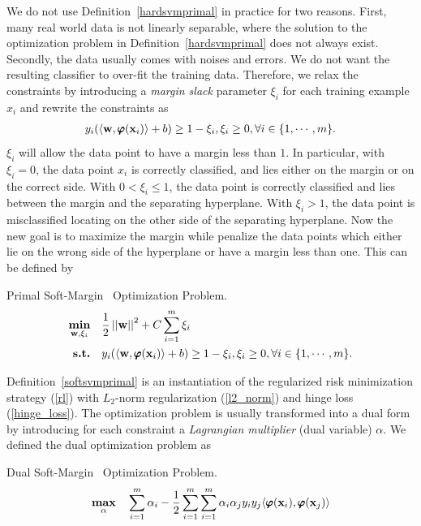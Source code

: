 {%
We do not use Definition~\ref{hardsvmprimal} in practice for two reasons. 
First, many real world data is not linearly separable, where the solution to the optimization problem in Definition~\ref{hardsvmprimal} does not always exist.
Secondly, the data usually comes with noises and errors.
We do not want the resulting classifier to over-fit the training data.
Therefore, we relax the constraints by introducing a \textit{margin slack} parameter $\xi_i$ for each training example $x_i$ and rewrite the constraints as 
\begin{align}
	y_i(\langle \mathbf {w}, \pmb \varphi(\mathbf {x}_i) \rangle + b) \ge 1-\xi_i, \xi_i\ge 0, \forall i\in\{1,\cdots,m\}. \label{softsvmconstraint}
\end{align}
$\xi_i$ will allow the data point to have a margin less than $1$.
In particular, with $\xi_i=0$, the data point $x_i$ is correctly classified, and lies either on the margin or on the correct side.
With $0<\xi_i\le 1$, the data point is correctly classified and lies between the margin and the separating hyperplane.
With $\xi_i>1$, the data point is misclassified locating on the other side of the separating hyperplane.
Now the new goal is to maximize the margin while penalize the data points which either lie on the wrong side of the hyperplane or have a margin less than one.
This can be defined by
\begin{definition}{Primal Soft-Margin \svm\ Optimization Problem.}\label{softsvmprimal}
	\begin{align*}
		\underset{\mathbf {w},\xi_i}{\textbf{min}} & \quad\frac{1}{2}\left|\left| \mathbf {w} \right|\right|^2 + C\sum_{i=1}^{m}\xi_i\\
		\textbf{s.t.} & \quad y_i(\langle \mathbf {w}, \pmb \varphi(\mathbf {x}_i) \rangle + b) \ge 1-\xi_i, \xi_i\ge 0, \forall i\in\{1,\cdots,m\}.
	\end{align*}
\end{definition}
\noindent
Definition~\ref{softsvmprimal} is an instantiation of the regularized risk minimization strategy (\ref{rl}) with $L_2$-norm regularization (\ref{l2_norm}) and hinge loss (\ref{hinge_loss}).
The optimization problem is usually transformed into a dual form by introducing for each constraint a \textit{Lagrangian multiplier} (dual variable) $\alpha$.
We defined the dual optimization problem as
\begin{definition}{Dual Soft-Margin \svm\ Optimization Problem.}\label{softsvmdual}
	\begin{align*}
		\underset{\valpha}{\maximize} & \quad\sum_{i=1}^{m}\alpha_i -\frac{1}{2}\sum_{i=1}^{m}\sum_{i=1}^{m}\alpha_i\alpha_jy_iy_j\ip{\varphib(\vx_i)}{\varphib(\vx_j)}\\

\end{align*}
\end{definition}}
